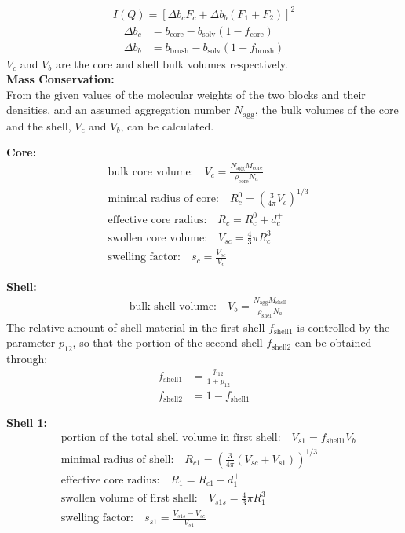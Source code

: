 \begin{align}
I(Q) = %
\left[\Delta b_c F_c + \Delta b_b (F_1+F_2)\right]^2
\end{align}
\begin{align}
\Delta b_c &= b_\text{core} - b_\text{solv}  (1-f_\text{core}) \\
\Delta b_b &= b_\text{brush} - b_\text{solv} (1-f_\text{brush})
\end{align}
$V_c$ and $V_b$ are the core and shell bulk volumes respectively.
\\

\noindent \textbf{Mass Conservation:} \\
From the given values of the molecular weights of the two blocks and
their densities, and an assumed aggregation number $N_\text{agg}$,
the bulk volumes of the core and the shell, $V_c$ and $V_b$, can be
calculated.

\noindent \textbf{Core:}
\begin{align}
& \text{bulk core volume:} \quad          V_c = \frac{N_\text{agg} M_\text{core}}{\rho_\text{core}N_a} \\
& \text{minimal radius of core:} \quad    R_c^0 = \left(\frac{3}{4\pi} V_c\right)^{1/3} \\
& \text{effective core radius:} \quad     R_c = R_c^0 + d_c^+ \\
& \text{swollen core volume:} \quad       V_{sc} = \frac{4}{3}\pi R_c^3 \\
& \text{swelling factor:} \quad           s_c = \frac{V_{sc}}{V_c}
\end{align}

\noindent \textbf{Shell:}
\begin{align}
& \text{bulk shell volume:} \quad         V_b = \frac{N_\text{agg}
M_\text{shell}}{\rho_\text{shell}N_a}
\end{align}
The relative amount of shell material in the first shell
$f_\text{shell1}$ is controlled by the parameter $p_{12}$, so that
the portion of the second shell $f_\text{shell2}$ can be obtained
through:
\begin{align}
f_\text{shell1} &= \frac{p_{12}}{1+p_{12}} \\
f_\text{shell2} &= 1-f_\text{shell1}
\end{align}

\noindent \textbf{Shell 1:}
\begin{align}
& \text{portion of the total shell volume in first shell:} \quad  V_{s1} = f_\text{shell1} V_b \\
& \text{minimal radius of shell:} \quad    R_{c1} = \left(\frac{3}{4\pi} (V_{sc}+V_{s1})\right)^{1/3} \\
& \text{effective core radius:} \quad     R_1 = R_{c1} + d_1^+ \\
& \text{swollen volume of first shell:} \quad       V_{s1s} = \frac{4}{3}\pi R_1^3 \\
& \text{swelling factor:} \quad           s_{s1} =
\frac{V_{s1s}-V_{sc}}{V_{s1}}
\end{align}

